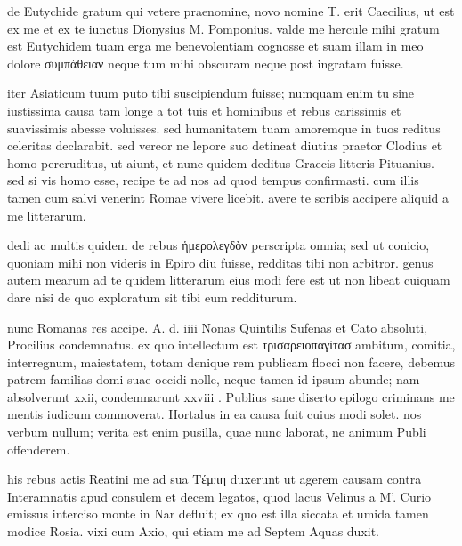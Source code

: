 


 de Eutychide gratum qui vetere praenomine, novo nomine T. erit Caecilius, ut est ex me et ex te iunctus Dionysius M. Pomponius. valde me hercule mihi gratum est Eutychidem tuam erga me benevolentiam cognosse et suam illam in meo dolore συμπάθειαν neque tum mihi obscuram neque post ingratam fuisse.

 iter Asiaticum tuum puto tibi suscipiendum fuisse; numquam enim tu sine iustissima causa tam longe a tot tuis et hominibus et rebus carissimis et suavissimis abesse voluisses. sed humanitatem tuam amoremque in tuos reditus celeritas declarabit. sed vereor ne lepore suo detineat diutius praetor Clodius et homo pereruditus, ut aiunt, et nunc quidem deditus Graecis litteris Pituanius. sed si vis homo esse, recipe te ad nos ad quod tempus confirmasti. cum illis tamen cum salvi venerint Romae vivere licebit. avere te scribis accipere aliquid a me litterarum.

 dedi ac multis quidem de rebus ἡμερολεγδὸν perscripta omnia; sed ut conicio, quoniam mihi non videris in Epiro diu fuisse, redditas tibi non arbitror. genus autem mearum ad te quidem litterarum eius modi fere est ut non libeat cuiquam dare nisi de quo exploratum sit tibi eum redditurum.

 nunc Romanas res accipe. A. d. iiii Nonas Quintilis Sufenas et Cato absoluti, Procilius condemnatus. ex quo intellectum est τρισαρειοπαγίτασ ambitum, comitia, interregnum, maiestatem, totam denique rem publicam flocci non facere, debemus patrem familias domi suae occidi nolle, neque tamen id ipsum abunde; nam absolverunt xxii, condemnarunt xxviii . Publius sane diserto epilogo criminans me mentis iudicum commoverat. Hortalus in ea causa fuit cuius modi solet. nos verbum nullum; verita est enim pusilla, quae nunc laborat, ne animum Publi offenderem.

 his rebus actis Reatini me ad sua Τέμπη duxerunt ut agerem causam contra Interamnatis apud consulem et decem legatos, quod lacus Velinus a M'. Curio emissus interciso monte in Nar defluit; ex quo est illa siccata et umida tamen modice Rosia. vixi cum Axio, qui etiam me ad Septem Aquas duxit.

